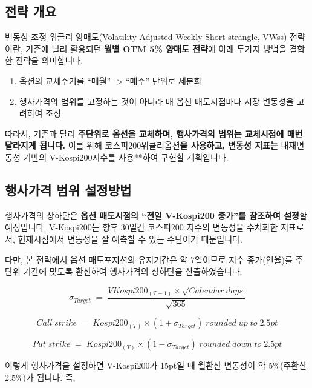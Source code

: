 \documentclass[
  a4paper,
  DIV=11,
  numbers=noendperiod]{scrreprt}
\providecommand{\tightlist}{%
  \setlength{\itemsep}{0pt}\setlength{\parskip}{0pt}}\usepackage{longtable,booktabs,array}
\begin{document}
\subsection*{전략 개요}\label{uxc804uxb7b5-uxac1cuxc694}

변동성 조정 위클리 양매도(Volatility Adjusted Weekly Short strangle,
VWss) 전략이란, 기존에 널리 활용되던 \textbf{월별 OTM 5\% 양매도 전략}에
아래 두가지 방법을 결합한 전략을 의미합니다.

\begin{enumerate}
\def\labelenumi{\arabic{enumi}.}
\tightlist
\item
  옵션의 교체주기를 ``매월'' -\textgreater{} ``매주'' 단위로 세분화
\item
  행사가격의 범위를 고정하는 것이 아니라 매 옵션 매도시점마다 시장
  변동성을 고려하여 조정
\end{enumerate}

따라서, 기존과 달리 \textbf{주단위로 옵션을 교체하며, 행사가격의 범위는
교체시점에 매번 달라지게 됩니다.} 이를 위해
코스피200위클리옵션\textbf{을 사용하고, 변동성 지표는} 내재변동성 기반의
V-Kospi200지수를 사용**하여 구현할 계획입니다.

\subsection*{행사가격 범위
설정방법}\label{uxd589uxc0acuxac00uxaca9-uxbc94uxc704-uxc124uxc815uxbc29uxbc95}

행사가격의 상하단은 \textbf{옵션 매도시점의 ``전일 V-Kospi200 종가''를
참조하여 설정}할 예정입니다. V-Kospi200는 향후 30일간 코스피200 지수의
변동성을 수치화한 지표로서, 현재시점에서 변동성을 잘 예측할 수 있는
수단이기 때문입니다.

다만, 본 전략에서 옵션 매도포지션의 유지기간은 약 7일이므로 지수
종가(연율)를 주단위 기간에 맞도록 환산하여 행사가격의 상하단을
산출하였습니다.

\[\sigma_{Target}\;=\;\frac{VKospi200_{(T-1)}\times\sqrt{Calendar\;days}}{\sqrt{365}}\]

\[Call\;strike\;=\;Kospi200_{(T)}\times (1+\sigma_{Target})\;rounded\;up\;to\;2.5pt\]

\[Put\;strike\;=\;Kospi200_{(T)}\times (1-\sigma_{Target})\;rounded\;down\;to\;2.5pt\]

이렇게 행사가격을 설정하면 V-Kospi200가 15pt일 때 월환산 변동성이 약
5\%(주환산 2.5\%)가 됩니다. 즉,
\end{document}
